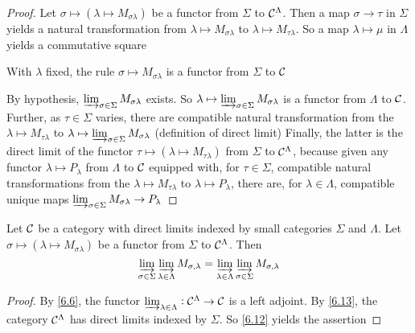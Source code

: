 \documentclass[11pt]{article}
\begin{document}
\begin{proof}
Let \(\sigma\mapsto(\lambda\mapsto M_{\sigma\lambda})\) be a functor from
\(\Sigma\) to \(\mathcal{C}^\Lambda\). Then a map \(\sigma\to\tau\) in \(\Sigma\) yields a
natural transformation from \(\lambda\mapsto M_{\sigma\lambda}\) to
\(\lambda\mapsto M_{\tau\lambda}\). So a map \(\lambda\mapsto\mu\) in \(\Lambda\)
yields a commutative square
\begin{center}
\end{center}
With \(\lambda\) fixed, the rule \(\sigma\mapsto M_{\sigma\lambda}\) is a functor from
\(\Sigma\) to \(\mathcal{C}\)

By hypothesis, \(\varinjlim_{\sigma\in\Sigma}M_{\sigma\lambda}\) exists. So
\(\lambda\mapsto\varinjlim_{\sigma\in\Sigma}M_{\sigma\lambda}\) is a functor
from \(\Lambda\) to \(\mathcal{C}\). Further, as \(\tau\in\Sigma\) varies, there are
compatible natural transformation from the \(\lambda\mapsto
   M_{\tau\lambda}\) to
\(\lambda\mapsto\varinjlim_{\sigma\in\Sigma}M_{\sigma\lambda}\) (definition
of direct limit) Finally, the latter is the direct limit of the functor
\(\tau\mapsto(\lambda\mapsto M_{\tau\lambda})\) from \(\Sigma\) to \(\mathcal{C}^\Lambda\),
because given any functor \(\lambda\mapsto P_\lambda\) from \(\Lambda\) to  \(\mathcal{C}\)
equipped with, for \(\tau\in\Sigma\), compatible natural transformations from
the \(\lambda\mapsto M_{\tau\lambda}\) to \(\lambda\mapsto P_\lambda\), there
are, for \(\lambda\in\Lambda\), compatible unique maps
\(\varinjlim_{\sigma\in\Sigma}M_{\sigma\lambda}\to P_\lambda\)
\end{proof}

\begin{theorem}
\label{6.14}
Let \(\mathcal{C}\) be a category with direct limits indexed by small categories \(\Sigma\)
and \(\Lambda\). Let \(\sigma\mapsto(\lambda\mapsto M_{\sigma\lambda})\) be a functor
from \(\Sigma\) to \(\mathcal{C}^\Lambda\). Then
\begin{equation*}
\varinjlim_{\sigma\in\Sigma}\varinjlim_{\lambda\in\Lambda}M_{\sigma,\lambda}=
\varinjlim_{\lambda\in\Lambda}\varinjlim_{\sigma\in\Sigma}M_{\sigma,\lambda}
\end{equation*}
\end{theorem}

\begin{proof}
By \ref{6.6}, the functor
\(\varinjlim_{\lambda\in\Lambda}:\mathcal{C}^\Lambda\to\mathcal{C}\) is a left adjoint.
By \ref{6.13}, the category \(\mathcal{C}^\Lambda\) has direct limits indexed by \(\Sigma\).
So \ref{6.12} yields the assertion
\end{proof}
\end{document}
